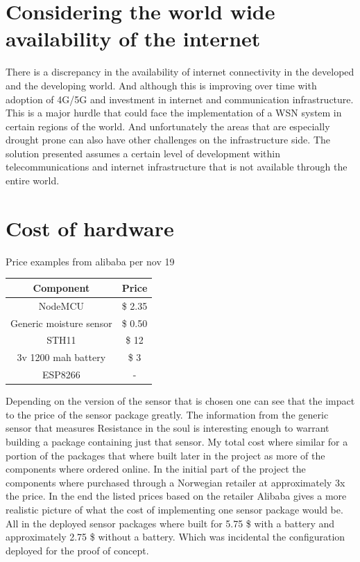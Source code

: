 \documentclass[]{uiophd}
\begin{document}
\section{Considering the world wide availability of the internet}
There is a discrepancy in the availability of internet connectivity in the developed and the developing world. And although this is improving over time with adoption of 4G/5G and investment in internet and communication infrastructure. This is a major hurdle that could face the implementation of a WSN system in certain regions of the world. And unfortunately the areas that are especially drought prone can also have other challenges on the infrastructure side. The solution presented assumes a certain level of development within telecommunications and internet infrastructure that is not available through the entire world.
\section{Cost of hardware}

Price examples from alibaba per nov 19

\begin{center}
 \begin{tabular}{||c | c||} 
 \hline
 Component & Price \\ [0.5ex] 
 \hline\hline
 NodeMCU & \$ 2.35 \\ 
 \hline
 Generic moisture sensor & \$ 0.50 \\
 \hline
 STH11 & \$ 12 \\
 \hline
 3v 1200 mah battery & \$ 3 \\
 \hline
 ESP8266 & - \\ [1ex] 
 \hline
\end{tabular}
\end{center}

Depending on the version of the sensor that is chosen one can see that the impact to the price of the sensor package greatly. The information from the generic sensor that measures Resistance in the soul is interesting enough to warrant building a package containing just that sensor. My total cost where similar for a portion of the packages that where built later in the project as  more of the components where ordered online. In the initial part of the project the components where purchased through a Norwegian retailer at approximately 3x the price. In the end the listed prices based on the retailer Alibaba gives a more realistic picture of what the cost of implementing one sensor package would be. All in the deployed sensor packages where built for 5.75 \$ with a battery and approximately 2.75 \$ without a battery. Which was incidental the configuration deployed for the proof of concept.
\end{document}

